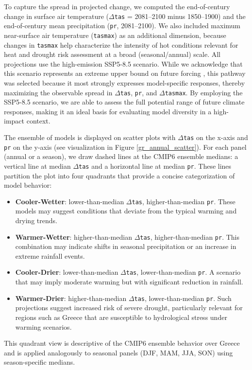 \documentclass[pdflatex,sn-chicago]{sn-jnl}%
\theoremstyle{thmstyleone}%
\theoremstyle{thmstyletwo}%
\theoremstyle{thmstylethree}%
\begin{document}
To capture the spread in projected change, we computed the end-of-century change in surface air temperature (\(\Delta\)\texttt{tas} = 2081--2100 minus 1850--1900) and the end-of-century mean precipitation (\texttt{pr}, 2081--2100). We also included maximum near-surface air temperature (\texttt{tasmax}) as an additional dimension, because changes in \texttt{tasmax} help characterize the intensity of hot conditions relevant for heat and drought risk assessment at a broad (seasonal/annual) scale. All projections use the high-emission SSP5-8.5 scenario. While we acknowledge that this scenario represents an extreme upper bound on future forcing \citep{Hausfather2020}, this pathway was selected because it most strongly expresses model-specific responses, thereby maximizing the observable spread in \(\Delta\)\texttt{tas}, \texttt{pr}, and \(\Delta\)\texttt{tasmax}. By employing the SSP5-8.5 scenario, we are able to assess the full potential range of future climate responses, making it an ideal basis for evaluating model diversity in a high-impact context.

The ensemble of models is displayed on scatter plots with \(\Delta\)\texttt{tas} on the x-axis and \texttt{pr} on the y-axis (see visualization in Figure \ref{gr_annual_scatter}). For each panel (annual or a season), we draw dashed lines at the CMIP6 ensemble medians: a vertical line at median \(\Delta\)\texttt{tas} and a horizontal line at median \texttt{pr}. These lines partition the plot into four quadrants that provide a concise categorization of model behavior:
\begin{itemize}
    \item \textbf{Cooler-Wetter}: lower-than-median \(\Delta\)\texttt{tas}, higher-than-median \texttt{pr}. These models may suggest conditions that deviate from the typical warming and drying trends.
    \item \textbf{Warmer-Wetter}: higher-than-median \(\Delta\)\texttt{tas}, higher-than-median \texttt{pr}. This combination may indicate shifts in seasonal precipitation or an increase in extreme rainfall events.
    \item \textbf{Cooler-Drier}: lower-than-median \(\Delta\)\texttt{tas}, lower-than-median \texttt{pr}. A scenario that may imply moderate warming but with significant reduction in rainfall.
    \item \textbf{Warmer-Drier}: higher-than-median \(\Delta\)\texttt{tas}, lower-than-median \texttt{pr}. Such projections suggest increased risk of severe drought, particularly relevant for regions such as Greece that are susceptible to hydrological stress under warming scenarios.
\end{itemize}
This quadrant view is descriptive of the CMIP6 ensemble behavior over Greece and is applied analogously to seasonal panels (DJF, MAM, JJA, SON) using season-specific medians.
\end{document}
